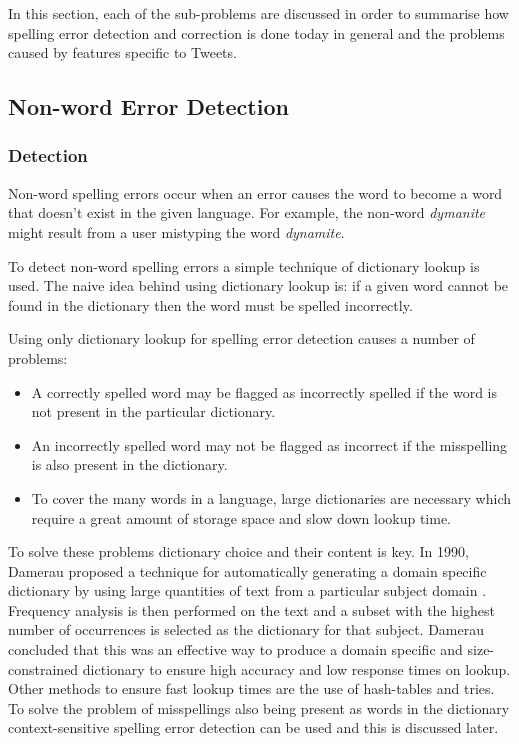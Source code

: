 In this section, each of the sub-problems are discussed in order to summarise how spelling error detection and correction is done today in general and the problems caused by features specific to Tweets.

\subsection{Non-word Error Detection}

\subsubsection{Detection}

Non-word spelling errors occur when an error causes the word to become a word that doesn't exist in the given language. For example, the non-word \emph{dymanite} might result from a user mistyping the word \emph{dynamite}.

To detect non-word spelling errors a simple technique of dictionary lookup is used. The naive idea behind using dictionary lookup is: if a given word cannot be found in the dictionary then the word must be spelled incorrectly.

Using only dictionary lookup for spelling error detection causes a number of problems: 

\begin{itemize}
\item
A correctly spelled word may be flagged as incorrectly spelled if the word is not present in the particular dictionary.
\item
An incorrectly spelled word may not be flagged as incorrect if the misspelling is also present in the dictionary.
\item
To cover the many words in a language, large dictionaries are necessary which require a great amount of storage space and slow down lookup time.
\end{itemize} 

To solve these problems dictionary choice and their content is key. In 1990, Damerau proposed a technique for automatically generating a domain specific dictionary by using large quantities of text from a particular subject domain \cite{Damerau1990}. Frequency analysis is then performed on the text and a subset with the highest number of occurrences is selected as the dictionary for that subject. Damerau concluded that this was an effective way to produce a domain specific and size-constrained dictionary to ensure high accuracy and low response times on lookup. Other methods to ensure fast lookup times are the use of hash-tables and tries. To solve the problem of misspellings also being present as words in the dictionary context-sensitive spelling error detection can be used and this is discussed later.

